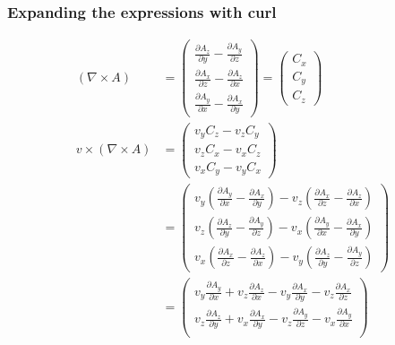\documentclass[smallextended]{svjour3}       %
\begin{document}
		\subsubsection{Expanding the expressions with curl}
		 \begin{align}
    \left( \nabla \times A \right) & = \begin{pmatrix}
           \frac{\partial A_z}{\partial y} - \frac{\partial A_y}{\partial z} \\
           \frac{\partial A_x}{\partial z} - \frac{\partial A_z}{\partial x} \\
           \frac{\partial A_y}{\partial x} - \frac{\partial A_x}{\partial y}
         \end{pmatrix} = \begin{pmatrix}
           C_x \\
           C_y \\
           C_z
         \end{pmatrix}\\
				v \times \left( \nabla \times A \right) & = \begin{pmatrix}
           v_y C_z
					 - v_z C_y\\
					v_z C_x
					 - v_x C_z\\
					v_x C_y
					 - v_y C_x
         \end{pmatrix}\\ & = \begin{pmatrix}
           v_y \left(\frac{\partial A_y}{\partial x} - \frac{\partial A_x}{\partial y}\right)
					 - v_z \left(\frac{\partial A_x}{\partial z} - \frac{\partial A_z}{\partial x}\right)\\
					v_z \left(\frac{\partial A_z}{\partial y} - \frac{\partial A_y}{\partial z}\right)
					 - v_x \left(\frac{\partial A_y}{\partial x} - \frac{\partial A_x}{\partial y}\right)\\
					v_x \left(\frac{\partial A_x}{\partial z} - \frac{\partial A_z}{\partial x}\right)
					 - v_y \left(\frac{\partial A_z}{\partial y} - \frac{\partial A_y}{\partial z}\right)
         \end{pmatrix}\\& = \begin{pmatrix}
           v_y \frac{\partial A_y}{\partial x} + v_z \frac{\partial A_z}{\partial x}
					- v_y \frac{\partial A_x}{\partial y} - v_z \frac{\partial A_x}{\partial z}\\
					v_z \frac{\partial A_z}{\partial y} + v_x \frac{\partial A_x}{\partial y}
					- v_z \frac{\partial A_y}{\partial z} - v_x \frac{\partial A_y}{\partial x}\\

\end{pmatrix}
\end{align}
\end{document}
